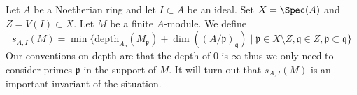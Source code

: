 \medskip\noindent
Let $A$ be a Noetherian ring and let $I \subset A$ be an ideal.
Set $X = \Spec(A)$ and $Z = V(I) \subset X$. Let $M$ be a finite $A$-module.
We define
\begin{equation}
\label{equation-cutoff}
s_{A, I}(M) =
\min \{
\text{depth}_{A_\mathfrak p}(M_\mathfrak p) + \dim((A/\mathfrak p)_\mathfrak q)
\mid
\mathfrak p \in X \setminus Z, \mathfrak q \in Z,
\mathfrak p \subset \mathfrak q
\}
\end{equation}
Our conventions on depth are that the depth of $0$ is $\infty$
thus we only need to consider primes $\mathfrak p$ in the support
of $M$. It will turn out that $s_{A, I}(M)$ is an important invariant of
the situation.
